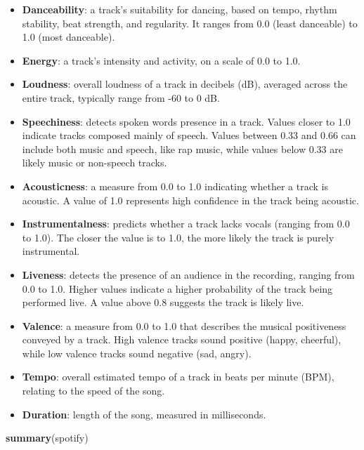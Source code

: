 \documentclass[
]{book}
\newenvironment{Shaded}{\begin{snugshade}}{\end{snugshade}}
\newcommand{\FunctionTok}[1]{\textcolor[rgb]{0.13,0.29,0.53}{\textbf{#1}}}
\newcommand{\NormalTok}[1]{#1}
\providecommand{\tightlist}{%
  \setlength{\itemsep}{0pt}\setlength{\parskip}{0pt}}
\begin{document}
\begin{itemize}
\tightlist
\item
  \textbf{Danceability}: a track's suitability for dancing, based on tempo, rhythm stability, beat strength, and regularity. It ranges from 0.0 (least danceable) to 1.0 (most danceable).
\item
  \textbf{Energy}: a track's intensity and activity, on a scale of 0.0 to 1.0.
\item
  \textbf{Loudness}: overall loudness of a track in decibels (dB), averaged across the entire track, typically range from -60 to 0 dB.
\item
  \textbf{Speechiness}: detects spoken words presence in a track. Values closer to 1.0 indicate tracks composed mainly of speech. Values between 0.33 and 0.66 can include both music and speech, like rap music, while values below 0.33 are likely music or non-speech tracks.
\item
  \textbf{Acousticness}: a measure from 0.0 to 1.0 indicating whether a track is acoustic. A value of 1.0 represents high confidence in the track being acoustic.
\item
  \textbf{Instrumentalness}: predicts whether a track lacks vocals (ranging from 0.0 to 1.0). The closer the value is to 1.0, the more likely the track is purely instrumental.
\item
  \textbf{Liveness}: detects the presence of an audience in the recording, ranging from 0.0 to 1.0. Higher values indicate a higher probability of the track being performed live. A value above 0.8 suggests the track is likely live.
\item
  \textbf{Valence}: a measure from 0.0 to 1.0 that describes the musical positiveness conveyed by a track. High valence tracks sound positive (happy, cheerful), while low valence tracks sound negative (sad, angry).
\item
  \textbf{Tempo}: overall estimated tempo of a track in beats per minute (BPM), relating to the speed of the song.
\item
  \textbf{Duration}: length of the song, measured in milliseconds.
\end{itemize}

\begin{Shaded}
\begin{Highlighting}[]
\FunctionTok{summary}\NormalTok{(spotify)}
\end{Highlighting}
\end{Shaded}
\end{document}
